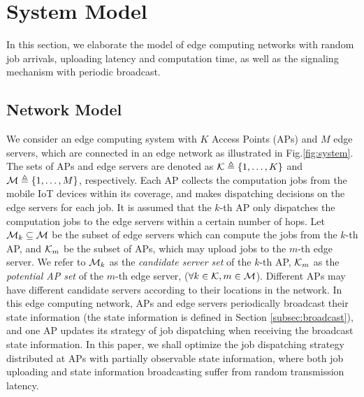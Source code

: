 \section{System Model}
\label{sec:model}
In this section, we elaborate the model of edge computing networks with random job arrivals, uploading latency and computation time, as well as the signaling mechanism with periodic broadcast.
\subsection{Network Model}
We consider an edge computing system with $K$ Access Points (APs) and $M$ edge servers, which are connected in an edge network as illustrated in Fig.\ref{fig:system}.
The sets of APs and edge servers are denoted as $\mathcal{K} \triangleq \{1,\dots,K\}$ and $\mathcal{M} \triangleq \{1,\dots,M\}$, respectively.
Each AP collects the computation jobs from the {mobile IoT devices} within its coverage, and makes dispatching {decisions} on the edge servers for each job.
It is assumed that the $k$-th AP only dispatches the computation jobs to the edge servers within a certain number of hops.
Let $\mathcal{M}_{k} \subseteq \mathcal{M}$ be the subset of edge servers which can compute the jobs from the $k$-th AP, and $\mathcal{K}_{m}$ be the subset of APs, which may upload jobs to the $m$-th edge server.
We refer to $\mathcal{M}_{k}$ as the \emph{candidate server set} of the $k$-th AP, $\mathcal{K}_{m}$ as the \emph{potential AP set} of the $m$-th edge server,  ($\forall k\in\mathcal{K}, m\in\mathcal{M}$).
Different APs may have different candidate servers according to their locations in the network.%
In this edge computing network, APs and edge servers periodically broadcast their state information (the state information is defined in Section \ref{subsec:broadcast}), and one AP updates its strategy of job dispatching when receiving the broadcast state information.
In this paper, we shall optimize the job dispatching strategy distributed at APs with partially observable state information, where both job uploading and state information broadcasting suffer from random transmission latency.

